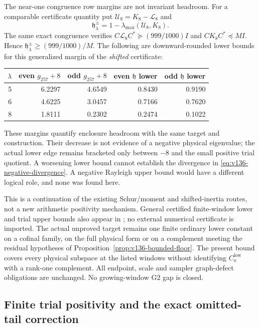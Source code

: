 \documentclass[11pt]{article}
\theoremstyle{remark}
\begin{document}
The near-one congruence row margins are not invariant headroom.
For a comparable certificate quantity put
$\mathcal U_8=K_8-\mathcal L_8$ and
\[
 \mathfrak h_\lambda^\pm
 =1-\lambda_{\max}(\mathcal U_8,K_8).
\]
The same exact congruence verifies
$C\mathcal L_8C^*\succeq(999/1000)I$ and
$CK_8C^*\preceq M I$. Hence
$\mathfrak h_\lambda^\pm\ge(999/1000)/M$.
The following are downward-rounded lower bounds for this generalized
margin of the \emph{shifted} certificate:
\begin{center}
\begin{tabular}{rrrrr}
\toprule
$\lambda$ & even $g_{257}+8$ & odd $g_{257}+8$
 & even $\mathfrak h$ lower & odd $\mathfrak h$ lower\\
\midrule
5&6.2297&4.6549&0.8430&0.9190\\
6&4.6225&3.0457&0.7166&0.7620\\
8&1.8111&0.2302&0.2474&0.1022\\
\bottomrule
\end{tabular}
\end{center}
These margins quantify enclosure headroom with the same target and
construction. Their decrease is not evidence of a negative physical
eigenvalue; the actual lower edge remains bracketed only between
$-8$ and the small positive trial quotient. A worsening lower bound
cannot establish the divergence in
\eqref{eq:v136-negative-divergence}. A negative Rayleigh upper bound
would have a different logical role, and none was found here.

This is a continuation of the existing Schur/moment and shifted-inertia
routes, not a new arithmetic positivity mechanism. General certified
finite-window lower and trial upper bounds also appear in
\cite{Zhu2026}; no external numerical certificate is imported.
The actual unproved target remains one finite ordinary lower constant
on a cofinal family, on the full physical form or on a complement
meeting the residual hypotheses of Proposition~\ref{prop:v136-bounded-floor}.
The present bound covers every physical subspace at the listed windows
without identifying $C_a^{\mathrm{low}}$ with a rank-one complement.
All endpoint, scale and sampler graph-defect obligations are unchanged.
No growing-window G2 gap is closed.


\subsection*{Finite trial positivity and the exact omitted-tail correction}
\end{document}
